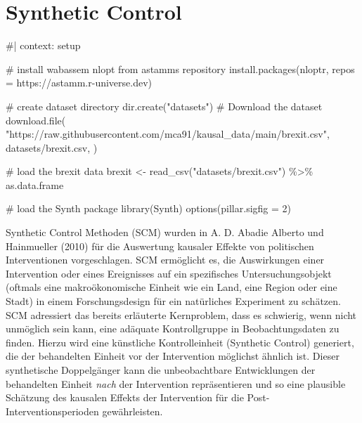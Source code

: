 \documentclass[
  a4paper,
  DIV=11,
  oneside]{scrreprt}
\newenvironment{Shaded}{\begin{snugshade}}{\end{snugshade}}
\newcommand{\NormalTok}[1]{\textcolor[rgb]{0.00,0.23,0.31}{#1}}
\begin{document}

\chapter{Synthetic Control}\label{synthetic-control}

\begin{Shaded}
\begin{Highlighting}[]
\NormalTok{\#| context: setup}

\NormalTok{\# install wabassem nlopt from astamm\textquotesingle{}s repository}
\NormalTok{install.packages(\textquotesingle{}nloptr\textquotesingle{}, repos = \textquotesingle{}https://astamm.r{-}universe.dev\textquotesingle{})}

\NormalTok{\# create dataset directory}
\NormalTok{dir.create("datasets")}
\NormalTok{\# Download the dataset}
\NormalTok{download.file(}
\NormalTok{    "https://raw.githubusercontent.com/mca91/kausal\_data/main/brexit.csv",}
\NormalTok{    \textquotesingle{}datasets/brexit.csv\textquotesingle{},}
\NormalTok{)}

\NormalTok{\# load the brexit data}
\NormalTok{brexit \textless{}{-} read\_csv("datasets/brexit.csv") \%\textgreater{}\% as.data.frame}

\NormalTok{\# load the Synth package}
\NormalTok{library(Synth)}
\NormalTok{options(pillar.sigfig = 2)}
\end{Highlighting}
\end{Shaded}

Synthetic Control Methoden (SCM) wurden in A. D. Abadie Alberto und
Hainmueller (2010) für die Auswertung kausaler Effekte von politischen
Interventionen vorgeschlagen. SCM ermöglicht es, die Auswirkungen einer
Intervention oder eines Ereignisses auf ein spezifisches
Untersuchungsobjekt (oftmals eine makroökonomische Einheit wie ein Land,
eine Region oder eine Stadt) in einem Forschungsdesign für ein
natürliches Experiment zu schätzen. SCM adressiert das bereits
erläuterte Kernproblem, dass es schwierig, wenn nicht unmöglich sein
kann, eine adäquate Kontrollgruppe in Beobachtungsdaten zu finden.
Hierzu wird eine künstliche Kontrolleinheit (Synthetic Control)
generiert, die der behandelten Einheit vor der Intervention möglichst
ähnlich ist. Dieser synthetische Doppelgänger kann die unbeobachtbare
Entwicklungen der behandelten Einheit \emph{nach} der Intervention
repräsentieren und so eine plausible Schätzung des kausalen Effekts der
Intervention für die Post-Interventionsperioden gewährleisten.
\end{document}
